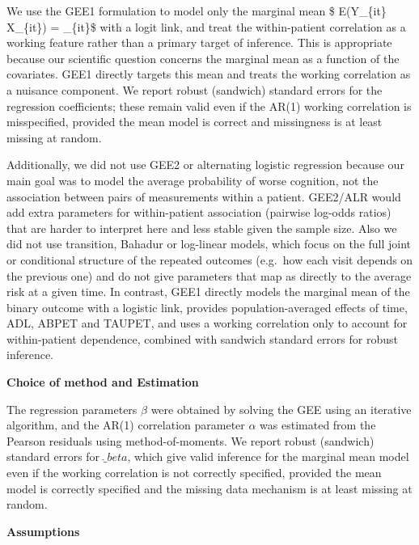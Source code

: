 \documentclass[
  11pt,
  letterpaper,
  DIV=11,
  numbers=noendperiod]{scrartcl}
\begin{document}
We use the GEE1 formulation to model only the marginal mean \$
E(Y\_\{it\} \mid X\_\{it\}) = \pi\_\{it\}\$ with a logit link, and treat
the within-patient correlation as a working feature rather than a
primary target of inference. This is appropriate because our scientific
question concerns the marginal mean as a function of the covariates.
GEE1 directly targets this mean and treats the working correlation as a
nuisance component. We report robust (sandwich) standard errors for the
regression coefficients; these remain valid even if the AR(1) working
correlation is misspecified, provided the mean model is correct and
missingness is at least missing at random.

Additionally, we did not use GEE2 or alternating logistic regression
because our main goal was to model the average probability of worse
cognition, not the association between pairs of measurements within a
patient. GEE2/ALR would add extra parameters for within-patient
association (pairwise log-odds ratios) that are harder to interpret here
and less stable given the sample size. Also we did not use transition,
Bahadur or log-linear models, which focus on the full joint or
conditional structure of the repeated outcomes (e.g.~how each visit
depends on the previous one) and do not give parameters that map as
directly to the average risk at a given time. In contrast, GEE1 directly
models the marginal mean of the binary outcome with a logistic link,
provides population-averaged effects of time, ADL, ABPET and TAUPET, and
uses a working correlation only to account for within-patient
dependence, combined with sandwich standard errors for robust inference.

\textbf{Choice of method and Estimation}

The regression parameters \(\beta\) were obtained by solving the GEE
using an iterative algorithm, and the AR(1) correlation parameter
\(\alpha\) was estimated from the Pearson residuals using
method-of-moments. We report robust (sandwich) standard errors for
\(\hat_beta\), which give valid inference for the marginal mean model
even if the working correlation is not correctly specified, provided the
mean model is correctly specified and the missing data mechanism is at
least missing at random.

\textbf{Assumptions}
\end{document}
